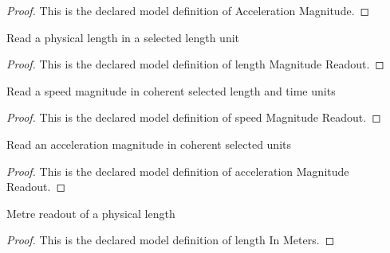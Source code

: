 \begin{proof}
  This is the declared model definition of Acceleration Magnitude.
\end{proof}
\begin{definition}
  \label{def:physics:phyx-mini-0688:phyxminiproblems-problemphyxmini0688-lengthmagnitudereadout}
  Read a physical length in a selected length unit
\end{definition}
\begin{proof}
  This is the declared model definition of length Magnitude Readout.
\end{proof}
\begin{definition}
  \label{def:physics:phyx-mini-0688:phyxminiproblems-problemphyxmini0688-speedmagnitudereadout}
  Read a speed magnitude in coherent selected length and time units
\end{definition}
\begin{proof}
  This is the declared model definition of speed Magnitude Readout.
\end{proof}
\begin{definition}
  \label{def:physics:phyx-mini-0688:phyxminiproblems-problemphyxmini0688-accelerationmagnitudereadout}
  Read an acceleration magnitude in coherent selected units
\end{definition}
\begin{proof}
  This is the declared model definition of acceleration Magnitude Readout.
\end{proof}
\begin{definition}
  \label{def:physics:phyx-mini-0688:phyxminiproblems-problemphyxmini0688-lengthinmeters}
  Metre readout of a physical length
\end{definition}
\begin{proof}
  This is the declared model definition of length In Meters.
\end{proof}
